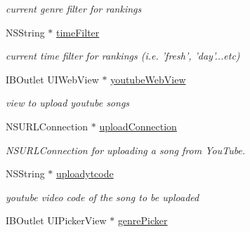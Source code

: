 \begin{DoxyCompactItemize}
\begin{DoxyCompactList}\small\item\em current genre filter for rankings \end{DoxyCompactList}\item 
\hypertarget{interface_c_b_h_view_controller_aad6b9b7a10cfa53c78575a8eccb802b0}{N\-S\-String $\ast$ \hyperlink{interface_c_b_h_view_controller_aad6b9b7a10cfa53c78575a8eccb802b0}{time\-Filter}}\label{interface_c_b_h_view_controller_aad6b9b7a10cfa53c78575a8eccb802b0}

\begin{DoxyCompactList}\small\item\em current time filter for rankings (i.\-e. 'fresh', 'day'...etc) \end{DoxyCompactList}\item 
\hypertarget{interface_c_b_h_view_controller_a463820dea5eb85e6d2275a8ea9c69fbf}{I\-B\-Outlet U\-I\-Web\-View $\ast$ \hyperlink{interface_c_b_h_view_controller_a463820dea5eb85e6d2275a8ea9c69fbf}{youtube\-Web\-View}}\label{interface_c_b_h_view_controller_a463820dea5eb85e6d2275a8ea9c69fbf}

\begin{DoxyCompactList}\small\item\em view to upload youtube songs \end{DoxyCompactList}\item 
\hypertarget{interface_c_b_h_view_controller_ad9acf984d613c2c8c72c0957100c6f59}{N\-S\-U\-R\-L\-Connection $\ast$ \hyperlink{interface_c_b_h_view_controller_ad9acf984d613c2c8c72c0957100c6f59}{upload\-Connection}}\label{interface_c_b_h_view_controller_ad9acf984d613c2c8c72c0957100c6f59}

\begin{DoxyCompactList}\small\item\em N\-S\-U\-R\-L\-Connection for uploading a song from You\-Tube. \end{DoxyCompactList}\item 
\hypertarget{interface_c_b_h_view_controller_a957f415cf4ea49ddcb4b00d5c4c7881e}{N\-S\-String $\ast$ \hyperlink{interface_c_b_h_view_controller_a957f415cf4ea49ddcb4b00d5c4c7881e}{uploadytcode}}\label{interface_c_b_h_view_controller_a957f415cf4ea49ddcb4b00d5c4c7881e}

\begin{DoxyCompactList}\small\item\em youtube video code of the song to be uploaded \end{DoxyCompactList}\item 
\hypertarget{interface_c_b_h_view_controller_ae5b2756df0c2a7615601923043519dea}{I\-B\-Outlet U\-I\-Picker\-View $\ast$ \hyperlink{interface_c_b_h_view_controller_ae5b2756df0c2a7615601923043519dea}{genre\-Picker}}\label{interface_c_b_h_view_controller_ae5b2756df0c2a7615601923043519dea}


\end{DoxyCompactItemize}
